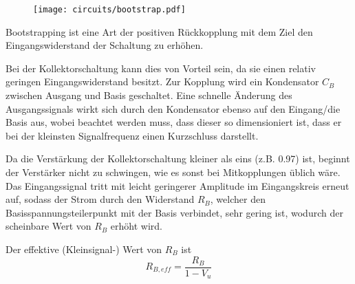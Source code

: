 \begin{figure}[H]
\begin{center}
  \texttt{[image: circuits/bootstrap.pdf]}
  \end{center}
\end{figure}


Bootstrapping ist eine Art der positiven Rückkopplung mit dem Ziel den
Eingangswiderstand der Schaltung zu erhöhen.

Bei der Kollektorschaltung kann
dies von Vorteil sein, da sie einen relativ geringen Eingangswiderstand besitzt.
Zur Kopplung wird ein Kondensator $C_B$ zwischen Ausgang und Basis geschaltet.
Eine schnelle Änderung des Ausgangssignals wirkt sich durch den Kondensator
ebenso auf den Eingang/die Basis aus, wobei beachtet werden muss, dass dieser so
dimensioniert ist, dass er bei der kleinsten Signalfrequenz einen Kurzschluss
darstellt.

Da die Verstärkung der Kollektorschaltung
kleiner als eins (z.B. 0.97) ist, beginnt der Verstärker nicht zu schwingen, wie es sonst
bei Mitkopplungen üblich wäre. Das Eingangssignal tritt mit leicht geringerer
Amplitude im Eingangskreis erneut auf, sodass der Strom durch den Widerstand
$R_B$, welcher den Basisspannungsteilerpunkt mit der Basis verbindet, sehr
gering ist, wodurch der scheinbare Wert von $R_B$ erhöht wird.

Der effektive (Kleinsignal-) Wert von $R_B$ ist
\[R_{B,eff} = \frac{R_B}{1-V_u}\]